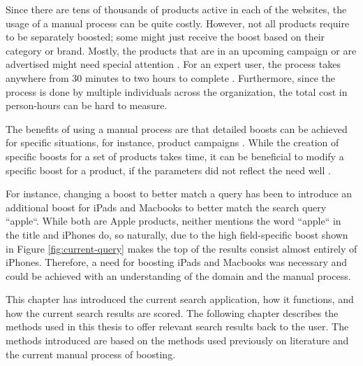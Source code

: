 Since there are tens of thousands of products active in each of the websites, the usage of a manual
process can be quite costly. 
However, not all products require to be separately boosted; some might just receive the boost based on their
category or brand. 
Mostly, the products that are in an upcoming campaign or are advertised might need special attention
\cite{searchSurvey}.
For an expert user, the process takes anywhere from 30 minutes to two hours to complete \cite{searchSurvey}.
Furthermore, since the process is done by multiple individuals across the organization, the total
cost in person-hours can be hard to measure.


The benefits of using a manual process are that detailed
boosts can be achieved for specific situations, for instance, product campaigns \cite{relevantSearch}.
While the creation of specific boosts for a set of products takes time, it can be beneficial
to modify a specific boost for a product, if the parameters did not reflect the need well
\cite{searchSurvey}.


For instance, changing a boost to better match a query has been to introduce
an additional boost for iPads and Macbooks to better match the search query ``apple``.
While both are Apple products, neither mentions the word ``apple`` in the title and
iPhones do, so naturally, due to the high field-specific boost shown in Figure \ref{fig:current-query}
makes the top of the results consist almost entirely of iPhones.
Therefore, a need for boosting iPads and Macbooks was necessary and could be achieved with
an understanding of the domain and the manual process. \cite{searchSurvey}


This chapter has introduced the current search application, how it functions, and how 
the current search results are scored.
The following chapter describes the methods used in this thesis to offer relevant search results
back to the user. 
The methods introduced are based on the methods used previously on literature and the current manual
process of boosting.


